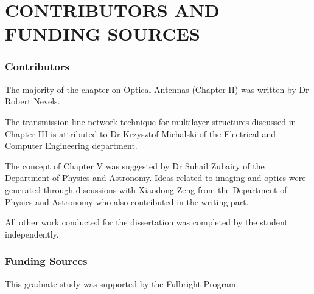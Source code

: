 %
%
%
%


\chapter*{CONTRIBUTORS AND FUNDING SOURCES}


\subsection*{Contributors}

The majority of the chapter on Optical Antennas (Chapter II) was written by Dr Robert Nevels.

The transmission-line network technique for multilayer structures discussed in Chapter III is attributed to Dr Krzysztof Michalski of the Electrical and Computer Engineering department.

The concept of Chapter V was suggested by Dr Suhail Zubairy of the Department of Physics and Astronomy. Ideas related to imaging and optics were generated through discussions with Xiaodong Zeng from the Department of Physics and Astronomy who also contributed in the writing part.

All other work conducted for the dissertation was completed by the student independently.

\subsection*{Funding Sources}
This graduate study was supported by the Fulbright Program.
\pagebreak{}
